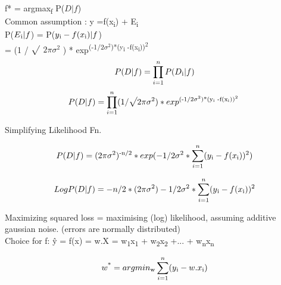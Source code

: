 f*  = argmax\textsubscript{f} P($D|f$) \\

Common assumption : y =f(x\textsubscript{i}) + E\textsubscript{i} \\

P($E\textsubscript{i} | f$) = P($y\textsubscript{i} -f(x\textsubscript{i}) | f $)\\

 =  (1 / $\sqrt{\mathstrut}$ $2\pi\sigma^2$ ) * exp\textsuperscript{(-1/$2\sigma^2$)*(y\textsubscript{i} -f(x\textsubscript{i}))\textsuperscript{2} }\\
 \begin{equation}
	P(D|f)=   \prod\limits_{i=1}^n P(D\textsubscript{i}|f)
\end{equation}
\begin{equation}
	P(D|f)=   \prod\limits_{i=1}^n (1 / \sqrt{\mathstrut} 2\pi\sigma^2 ) * exp\textsuperscript{(-1/2$\sigma^2$)*(y\textsubscript{i} -f(x\textsubscript{i}))\textsuperscript{2} }\end{equation}
	
Simplifying Likelihood Fn.

\begin{equation}
	P(D|f)=    (2\pi\sigma^2)\textsuperscript{-n/2}  * exp( -1/2 \sigma^2 *\sum\limits_{i=1}^n (y\textsubscript{i} -f(x\textsubscript{i}))\textsuperscript{2})
	 \end{equation}
	 
\begin{equation}
Log P(D|f)=   -n/2 * (2\pi\sigma^2)   - 1/2 \sigma^2 *\sum\limits_{i=1}^n (y\textsubscript{i} -f(x\textsubscript{i}))\textsuperscript{2}
	\end{equation}

Maximizing squared loss = maximising (log) likelihood, assuming additive gaussian noise. (errors are normally distributed) \\

Choice for f: \^{y} = f(x) = w.X = w\textsubscript{1}x\textsubscript{1} + w\textsubscript{2}x\textsubscript{2} +... + w\textsubscript{n}x\textsubscript{n}

 \begin{equation}
	w\textsuperscript{*} = argmin\textsubscript{w}   \sum\limits_{i=1}^n (y\textsubscript{i} - w.x\textsubscript{i})
\end{equation}

